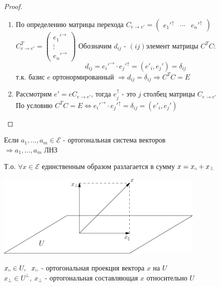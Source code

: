 \begin{proof} \tab
    \begin{enumerate}
        \item По определению матрицы перехода $C_{e \to e'} = \begin{pmatrix}
            e_1'^{\uparrow} & \cdots & e_n'^{\uparrow}
        \end{pmatrix}$\\
        $C^T_{e\to e'} = \begin{pmatrix}
            e_1'^{\rightarrow}  \\ \vdots \\ e_n'^{\rightarrow} 
        \end{pmatrix}$ Обозначим $d_{ij}$ - $(ij)$элемент матрицы $C^TC:$ 
        $$d_{ij} = e_i'^{\rightarrow} \cdot e_j'^{\uparrow} = (e'_i,e_j') = \delta_{ij}$$
        т.к. базис $e$ ортонормированный $\Longrightarrow d_{ij} = \delta_{ij} \Longrightarrow C^TC = E$
        \item Рассмотрим $e' = eC_{e\to e'}$, тогда $e_j^{\uparrow}$ - это $j$ столбец матрицы $C_{e\to e'}$\\
        По условию $C^TC = E \Longleftrightarrow e_i'^{\rightarrow} \cdot e_j'^{\uparrow} = \delta_{ij} = (e'_i,e_j')$
    \end{enumerate}    
\end{proof}
\begin{lemma}
    Если $a_1,...,a_m \in \mathcal{E}$ - ортогональная система векторов\\ 
    \tab[13cm] $\Longrightarrow  a_1,...,a_m$ ЛНЗ  
\end{lemma}
Т.о. $\forall x \in \mathcal{E}$ единственным образом разлагается в сумму $x = x_{\shortparallel} + x_{\perp}$
\begin{center}
    \includegraphics[width=10cm]{image/Asymptote/3/linal-3-1.pdf}
\end{center}
$x_{\shortparallel} \in U, \ \ x_{\shortparallel}$ - ортогональная проекция вектора $x$ на $U$\\
$x_{\perp} \in U^{\perp}, \ x_{\perp}$ - ортогональная составляющая $x$ относительно $U$
